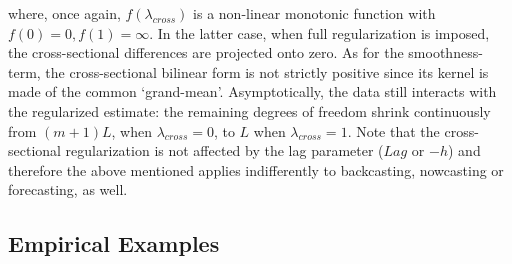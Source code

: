\documentclass[a4paper]{book}
\begin{document}
where, once again, $f(\lambda_{cross})$ is a non-linear monotonic function with $f(0)=0, f(1)=\infty$. In the latter case, when full regularization is imposed, the cross-sectional differences are projected onto zero. As for the smoothness-term, the cross-sectional bilinear form is not strictly positive since its kernel is made of the common `grand-mean'. Asymptotically, the data still interacts with the regularized estimate: the remaining degrees of freedom shrink continuously from $(m+1)L$, when $\lambda_{cross}=0$, to $L$ when $\lambda_{cross}=1$.  Note that the cross-sectional regularization is not affected by the lag parameter ($Lag$ or $-h$) and therefore the above mentioned applies indifferently to backcasting, nowcasting or forecasting, as well.


\subsection{Empirical Examples}
\end{document}
